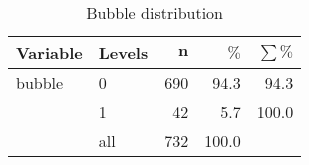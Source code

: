 \begin{table}[ht]
\centering
\begingroup\normalsize
\begin{tabular}{ll|rrr}
 \textbf{Variable} & \textbf{Levels} & $\mathbf{n}$ & $\mathbf{\%}$ & $\mathbf{\sum \%}$ \\ 
  \hline
bubble & 0 & 690 & 94.3 & 94.3 \\ 
   & 1 & 42 & 5.7 & 100.0 \\ 
   \hline
 & all & 732 & 100.0 &  \\ 
   \hline
\hline
\end{tabular}
\endgroup
\caption{Bubble distribution} 
\label{tab:imbalance}
\end{table}
